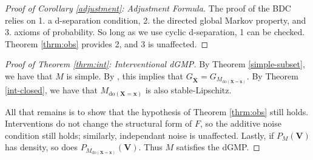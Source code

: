 \documentclass[letterpaper,10pt]{article}
\newtheorem{theorem}{Theorem}
\newtheorem{corollary}{Corollary}
\newtheorem{remark}{Remark}
\begin{document}

\begin{proof}[Proof of Corollary \ref{adjustment}: Adjustment Formula]
The proof of the BDC relies on 1. a d-separation condition, 2. the directed global Markov property, and 3. axioms of probability. So long as we use cyclic d-separation, 1 can be checked. Theorem \ref{thrm:obs} provides 2, and 3 is unaffected.
\end{proof}



\begin{proof}[Proof of Theorem \ref{thrm:int}: Interventional dGMP]
By Theorem \ref{simple-subset}, we have that $M$ is simple.
By \cite{Foundations}, this implies that $G_{\overline{\mathbf{X}}}=G_{M_{\text{do}(\mathbf{X}=\mathbf{x})}}$.
By Theorem \ref{int-closed}, we have that $M_{\text{do}(\mathbf{X}=\mathbf{x})}$ is also stable-Lipschitz.

All that remains is to show that the hypothesis of Theorem \ref{thrm:obs} still holds. Interventions do not change the structural form of $F$, so the additive noise condition still holds; similarly, independant noise is unaffected. Lastly, if $P_M(\mathbf{V})$ has density, so does $P_{M_{\text{do}(\mathbf{X}=\mathbf{x})}}(\mathbf{V})$.
Thus $M$ satisfies the dGMP.
\end{proof}

\end{document}
